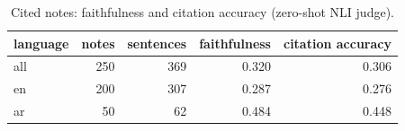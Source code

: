 \begin{table}[t]
\centering
\caption{Cited notes: faithfulness and citation accuracy (zero-shot NLI judge).}
\label{tab:tab_explain}
\begin{tabular}{lrrrr}
\toprule
language & notes & sentences & faithfulness & citation accuracy \\
\midrule
all & 250 & 369 & 0.320 & 0.306 \\
en & 200 & 307 & 0.287 & 0.276 \\
ar & 50 & 62 & 0.484 & 0.448 \\
\bottomrule
\end{tabular}
\end{table}
